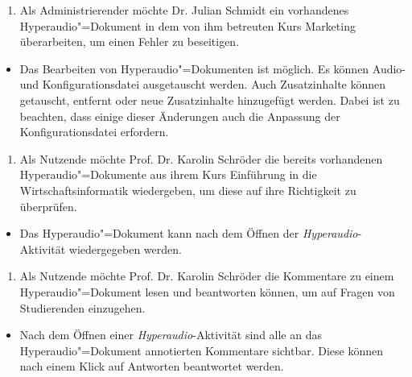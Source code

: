 \vspace{0.25cm}
\begin{enumerate}[resume*]
\item \label{US-Admin-Bearbeiten-Eval} Als Administrierender möchte Dr. Julian Schmidt ein vorhandenes Hyperaudio"=Dokument in dem von ihm betreuten Kurs \glqq Marketing\grqq{} überarbeiten, um einen Fehler zu beseitigen.
\end{enumerate}
\vspace{-0.1cm}
\begin{itemize}
\item[\Checkmark]
Das Bearbeiten von Hyperaudio"=Dokumenten ist möglich. Es können Audio- und Konfigurationsdatei ausgetauscht werden. Auch Zusatzinhalte können getauscht, entfernt oder neue Zusatzinhalte hinzugefügt werden. Dabei ist zu beachten, dass einige dieser Änderungen auch die Anpassung der Konfigurationsdatei erfordern.
\end{itemize}
\vspace{0.25cm}
\begin{enumerate}[resume*]
\item \label{US-Wiedergabe-Eval} Als Nutzende möchte Prof. Dr. Karolin Schröder die bereits vorhandenen Hyperaudio"=Dokumente aus ihrem Kurs \glqq Einführung in die Wirtschaftsinformatik\grqq{} wiedergeben, um diese auf ihre Richtigkeit zu überprüfen.
\end{enumerate}
\vspace{-0.1cm}
\begin{itemize}
\item[\Checkmark]
Das Hyperaudio"=Dokument kann nach dem Öffnen der \textit{Hyperaudio}-Aktivität wiedergegeben werden.
\end{itemize}
\vspace{0.25cm}
\begin{enumerate}[resume*]
\item \label{US-Antwort-L-Eval} Als Nutzende möchte Prof. Dr. Karolin Schröder die Kommentare zu einem Hyperaudio"=Dokument lesen und beantworten können, um auf Fragen von Studierenden einzugehen.
\end{enumerate}
\vspace{-0.1cm}
\begin{itemize}
\item[\Checkmark]
Nach dem Öffnen einer \textit{Hyperaudio}-Aktivität sind alle an das Hyperaudio"=Dokument annotierten Kommentare sichtbar. Diese können nach einem Klick auf \glqq Antworten\grqq{} beantwortet werden.
\end{itemize}

